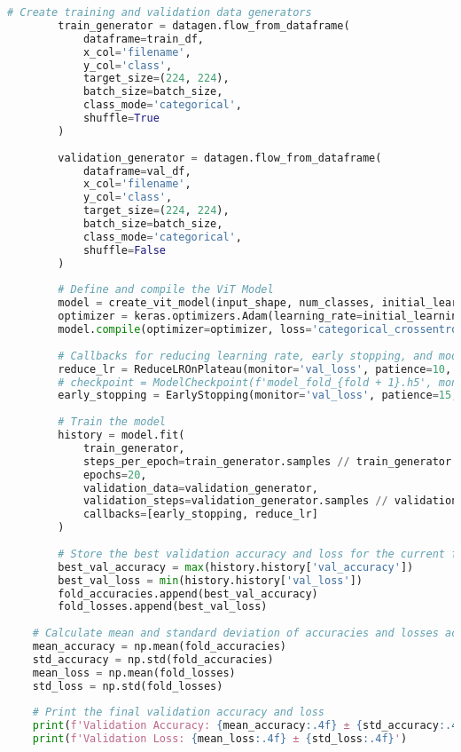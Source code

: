 \begin{lstlisting}[language=Python]
        # Create training and validation data generators
        train_generator = datagen.flow_from_dataframe(
            dataframe=train_df,
            x_col='filename',
            y_col='class',
            target_size=(224, 224),
            batch_size=batch_size,
            class_mode='categorical',
            shuffle=True
        )
    
        validation_generator = datagen.flow_from_dataframe(
            dataframe=val_df,
            x_col='filename',
            y_col='class',
            target_size=(224, 224),
            batch_size=batch_size,
            class_mode='categorical',
            shuffle=False
        )
    
        # Define and compile the ViT Model
        model = create_vit_model(input_shape, num_classes, initial_learning_rate, dropout_rate)
        optimizer = keras.optimizers.Adam(learning_rate=initial_learning_rate)
        model.compile(optimizer=optimizer, loss='categorical_crossentropy', metrics=['accuracy'])
    
        # Callbacks for reducing learning rate, early stopping, and model checkpointing
        reduce_lr = ReduceLROnPlateau(monitor='val_loss', patience=10, factor=0.3, min_lr=1e-6, verbose=1)
        # checkpoint = ModelCheckpoint(f'model_fold_{fold + 1}.h5', monitor='val_loss', verbose=1, save_best_only=True)
        early_stopping = EarlyStopping(monitor='val_loss', patience=15, verbose=1, mode='auto')
    
        # Train the model
        history = model.fit(
            train_generator,
            steps_per_epoch=train_generator.samples // train_generator.batch_size,
            epochs=20,
            validation_data=validation_generator,
            validation_steps=validation_generator.samples // validation_generator.batch_size,
            callbacks=[early_stopping, reduce_lr]
        )
    
        # Store the best validation accuracy and loss for the current fold
        best_val_accuracy = max(history.history['val_accuracy'])
        best_val_loss = min(history.history['val_loss'])
        fold_accuracies.append(best_val_accuracy)
        fold_losses.append(best_val_loss)
    
    # Calculate mean and standard deviation of accuracies and losses across all folds
    mean_accuracy = np.mean(fold_accuracies)
    std_accuracy = np.std(fold_accuracies)
    mean_loss = np.mean(fold_losses)
    std_loss = np.std(fold_losses)
    
    # Print the final validation accuracy and loss
    print(f'Validation Accuracy: {mean_accuracy:.4f} ± {std_accuracy:.4f}')
    print(f'Validation Loss: {mean_loss:.4f} ± {std_loss:.4f}')
\end{lstlisting}




